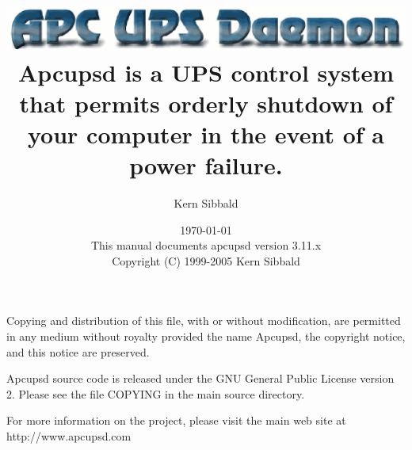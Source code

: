 \documentclass[11pt,a4paper]{report}
\begin{document}
\sloppy

\parskip 10pt
\parindent 0pt

\title{\includegraphics{./apcupsd.eps} \\ \bigskip
   \Large{Apcupsd is a UPS control system that permits
   orderly shutdown of your
   computer in the event of a power failure.} }
\author{Kern Sibbald}
\date{\vspace{2.0in}\today \\
      This manual documents apcupsd version 3.11.x \\
Copyright (C) 1999-2005 Kern Sibbald }


\maketitle

Copying and distribution of this file, with or without
modification, are permitted in any medium without royalty
provided the name Apcupsd, the copyright notice, and this notice
are preserved.

Apcupsd source code is released under the GNU General Public
License version 2. Please see the file COPYING in the main source
directory.

For more information on the project, please visit the main web
site at http://www.apcupsd.com

\clearpage
\tableofcontents
\clearpage
\listoffigures
\clearpage
\listoftables
\clearpage


\printindex
\end{document}
